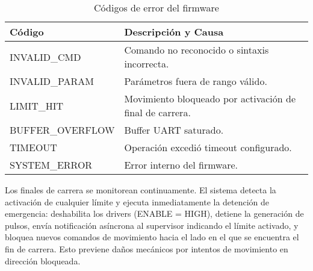 \begin{table}[H]
\centering
\begin{tabular}{|l|p{9cm}|}
\hline
\textbf{Código} & \textbf{Descripción y Causa} \\
\hline
INVALID\_CMD & Comando no reconocido o sintaxis incorrecta. \\
\hline
INVALID\_PARAM & Parámetros fuera de rango válido. \\
\hline
LIMIT\_HIT & Movimiento bloqueado por activación de final de carrera. \\
\hline
BUFFER\_OVERFLOW & Buffer UART saturado. \\
\hline
TIMEOUT & Operación excedió timeout configurado. \\
\hline
SYSTEM\_ERROR & Error interno del firmware. \\
\hline
\end{tabular}
\caption{Códigos de error del firmware}
\label{tab:codigos_error}
\end{table}

Los finales de carrera se monitorean continuamente. El sistema detecta la activación de cualquier límite y ejecuta inmediatamente la detención de emergencia: deshabilita los drivers (ENABLE = HIGH), detiene la generación de pulsos, envía notificación asíncrona al supervisor indicando el límite activado, y bloquea nuevos comandos de movimiento hacia el lado en el que se encuentra el fin de carrera. Esto previene daños mecánicos por intentos de movimiento en dirección bloqueada.
